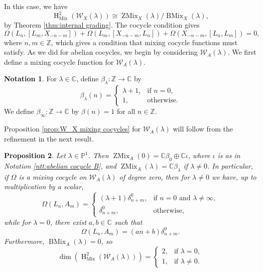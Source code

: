 \documentclass[11pt, svgnames]{amsart}
\newcommand{\ZZ}{\mathbb{Z}}
\newcommand{\CC}{\mathbb{C}}
\newcommand{\PP}{\mathbb{P}}
\newcommand{\W}{\mathcal{W}}
\DeclareMathOperator{\HH}{H}
\DeclareMathOperator{\Mix}{Mix}
\DeclareMathOperator{\ZMix}{ZMix}
\DeclareMathOperator{\BMix}{BMix}
\newtheorem{proposition}{Proposition}[section]
\theoremstyle{definition}
\newtheorem{Notation}[proposition]{Notation}
\begin{document}
In this case, we have
$$\HH_{\Mix}^2(\W_X(\lambda)) \cong \ZMix_X(\lambda)/\BMix_X(\lambda),$$
by Theorem \ref{thm:internal grading}. The cocycle condition gives
\begin{equation}\label{eq:W_X mixing cocycle cond}
    \Omega(L_n,[L_m,X_{-n-m}]) + \Omega(L_m,[X_{-n-m},L_n]) + \Omega(X_{-n-m},[L_n,L_m]) = 0,
\end{equation}
where $n,m \in \ZZ$, which gives a condition that mixing cocycle functions must satisfy. As we did for abelian cocycles, we begin by considering $\W_A(\lambda)$. We first define a mixing cocycle function for $\W_A(\lambda)$.

\begin{Notation}\label{ntt:mixing cocycle A}
    For $\lambda \in \CC$, define $\beta_\lambda \colon \ZZ \to \CC$ by
    $$\beta_\lambda(n) = \begin{cases}
        \lambda + 1, &\text{if $n  = 0$}, \\
        1, &\text{otherwise}.
    \end{cases}$$
    We define $\beta_\infty \colon \ZZ \to \CC$ by $\beta(n) = 1$ for all $n \in \ZZ$.
\end{Notation}

Proposition \ref{prop:W_X mixing cocycles} for $\W_A(\lambda)$ will follow from the refinement in the next result.

\begin{proposition}\label{prop:W_A mixing cocycles}
    Let $\lambda \in \PP^1$. Then $\ZMix_A(0) = \CC \beta_0 \oplus \CC \iota$, where $\iota$ is as in Notation \ref{ntt:abelian cocycle B}, and $\ZMix_A(\lambda) = \CC \beta_\lambda$ if $\lambda \neq 0$. In particular, if $\Omega$ is a mixing cocycle on $\W_A(\lambda)$ of degree zero, then for $\lambda \neq 0$ we have, up to multiplication by a scalar,
    $$\Omega(L_n,A_m) = \begin{cases}
        (\lambda + 1)\delta_{n+m}^0, &\text{if } n = 0 \text{ and } \lambda \neq \infty, \\
        \delta_{n+m}^0, &\text{otherwise},
    \end{cases}$$
    while for $\lambda = 0$, there exist $a,b \in \CC$ such that
    $$\Omega(L_n,A_m) = (an + b)\delta_{n+m}^0.$$
    Furthermore, $\BMix_A(\lambda) = 0$, so
    $$\dim(\HH_{\Mix}^2(\W_A(\lambda))) = \begin{cases}
        2, &\text{if } \lambda = 0,\\
        1, &\text{if } \lambda \neq 0.
    \end{cases}$$
\end{proposition}
\end{document}
